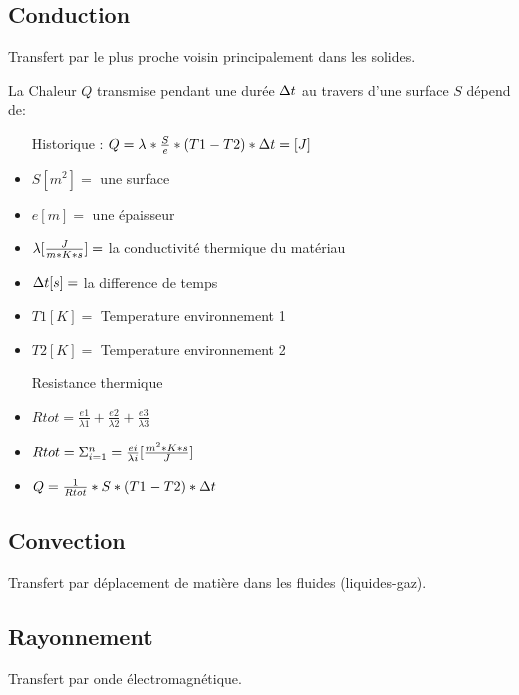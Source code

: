 \subsection{Conduction}
Transfert par le plus proche voisin principalement dans les solides.

La Chaleur $Q$ transmise pendant une durée ${\Delta}t$ au travers d'une surface $S$ dépend de:
\begin{itemize}
    \item[Historique :] $Q = \lambda * \frac{S}{e} *(T1-T2)* {\Delta}t = [J]$
    \item $S [m^2] =$ une surface
    \item $e [m] =$ une épaisseur
    \item $\lambda [\frac{J}{m*K*s}] =$ la conductivité thermique du matériau
    \item ${\Delta}t [s] =$ la difference de temps
    \item $T1 [K]=$ Temperature environnement 1
    \item $T2 [K]=$ Temperature environnement 2
    \item[Resistance thermique]
    \item$Rtot = \frac{e1}{{\lambda}1}+\frac{e2}{{\lambda}2}+\frac{e3}{{\lambda}3}$
    \item$Rtot = \Sigma^{n}_{i=1} = \frac{ei}{{\lambda}i} [\frac{m^2*K*s}{J}]$
    \item$Q = \frac{1}{Rtot} * S *(T1-T2) * {\Delta}t$ 
\end{itemize}



\subsection{Convection}
Transfert par déplacement de matière dans les fluides (liquides-gaz).

\subsection{Rayonnement}
Transfert par onde électromagnétique. 